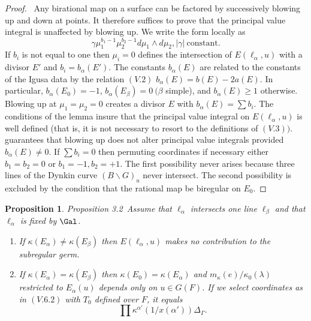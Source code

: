 \documentclass{memo-l}
\newtheorem{proposition}[theorem]{Proposition}
\theoremstyle{definition}
\theoremstyle{remark}
\numberwithin{section}{chapter}
\numberwithin{equation}{chapter}
\begin{document}
\begin{proof} \ Any birational map on a surface can be factored by
successively blowing up and down at points.  It therefore suffices to prove
that the principal value integral is unaffected by blowing up.  We write
the form locally as
$$
{\gamma}{\mu}_{1}^{b_{1}-1} {\mu}_{2}^{b_{2}-1}
d{\mu}_{1}\wedge d{\mu}_{2}, \vert {\gamma}\vert\ {\text{constant}}.
$$
If $b_{i}$ is not equal to one then ${\mu}_{i}  =  0$ defines the
intersection of $E({\ell}_{{\alpha}},u)$ with a divisor $E'$ and $b_{i}  =
b_{{\alpha}}(E')$.  The constants $b_{{\alpha}}(E)$ are related to the
constants of the Igusa data by the relation $(V.2)$ $b_{{\alpha}}(E)  =  b(E) -
2a(E)$.  In particular, $b_{{\alpha}}(E_{0})  =  -1$,
$b_{{\alpha}}(E_{{\beta}})  =  0 \ ({\beta}$ simple), and $b_{{\alpha}}(E) \ge
1$ otherwise.  Blowing up at ${\mu}_{1}  =  {\mu}_{2}  =  0$ creates a
divisor $E$ with $b_{{\alpha}}(E)  =  \sum b_{i}$.  The conditions of the
lemma insure that the principal value integral on $E({\ell}_{{\alpha}},u)$
is well defined (that is, it is not necessary to resort to the definitions
of $(V.3))$.  \cite{MR748510} guarantees that blowing up does not alter principal
value integrals provided $b_{{\alpha}}(E)  \ne 0$.  If $\sum b_{i}  =  0$
then permuting coordinates if necessary either $b_{1} = b_{2} = 0$ or $b_{1}  =
-1, b_{2}  =  +1$.  The first possibility never arises because three lines of
the Dynkin curve $(B\backslash G)_{u}$ never intersect.  The second
possibility is excluded by the condition that the rational map be biregular
on $E_{0}$.
\end{proof}

{\medskip}

\begin{proposition}{Proposition 3.2}\ Assume that ${\ell}_{{\alpha}}$ intersects
one line ${\ell}_{{\beta}}$ and that ${\ell}_{{\alpha}}$ is fixed by
$\Gal$.
\begin{enumerate}[label=\alph*)]
\item If ${\kappa}(E_{{\alpha}})  \ne {\kappa}(E_{{\beta}})$ then
$E({\ell}_{{\alpha}},u)$ makes no contribution to the subregular germ.
\item If ${\kappa}(E_{{\alpha}})  =  {\kappa}(E_{{\beta}})$ then
${\kappa}(E_{0})  =  {\kappa}(E_{{\alpha}})$ and
$m_{{\kappa}}(e)/{\kappa}_{0}({\lambda})$ restricted to $E_{{\alpha}}(u)$
depends only on $u  \in  G(F)$.  If we select coordinates as in $(V.6.2)$
with $T_{0}$ defined over $F$, it equals
$$
\prod{\kappa}^{{\alpha}'}(1/x({\alpha}')){\Delta}_{{\Gamma}} .
$$
\end{enumerate}
\end{proposition}
\end{document}
